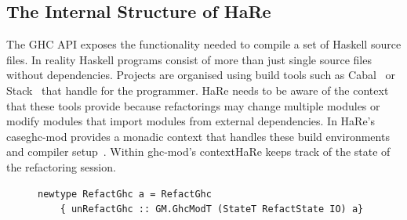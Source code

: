 \DIFaddbegin {}

\DIFaddend \subsection{The Internal Structure of HaRe}
\label{hareInners}

The GHC API exposes \DIFdelbegin {}\DIFdelend the functionality needed to compile a set of Haskell source files. In reality Haskell programs consist of more than just single source files without dependencies. Projects are organised using build tools such as Cabal~\citep{cabal} or Stack~\citep{stack} that handle \DIFdelbegin {}\DIFdelend \DIFaddbegin {}\DIFaddend for the programmer. HaRe needs to be aware of the context that these tools provide because refactorings may change multiple modules or modify modules that import modules from external dependencies. In HaRe's case\DIFaddbegin \DIFadd{, }\DIFaddend ghc-mod provides a monadic context that handles these build environments and compiler setup~\citep{ghcMod}. Within ghc-mod's context\DIFaddbegin \DIFadd{, }\DIFaddend HaRe keeps track of the state of the refactoring session.

\DIFdelbegin %
\DIFdelend \DIFaddbegin \begin{figure}[t]
\begin{lstlisting}
newtype RefactGhc a = RefactGhc
    { unRefactGhc :: GM.GhcModT (StateT RefactState IO) a}
\end{lstlisting}
\caption{\texttt{}}
\label{refactghc}
\end{figure}
\DIFaddend 

